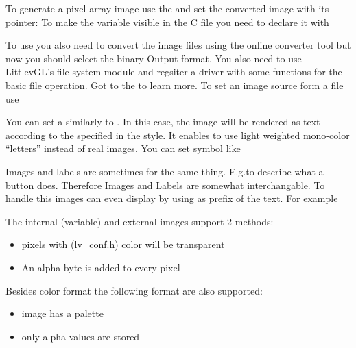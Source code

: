 \documentclass[letterpaper,10pt,english]{sphinxmanual}
\begin{document}
To generate a pixel array  image use the  and set the converted image with its pointer: 
To make the variable visible in the C file you need to declare it with 

To use  you also need to convert the image files using the online converter tool but now you should select the binary Output format.
You also need to use LittlevGL’s file system module and regsiter a driver with some functions for the basic file operation. Got to the {\hyperref[\detokenize{overview/file-system::doc}]{}} to learn more.
To set an image source form a file use 

You can set a   similarly to {\hyperref[\detokenize{object-types/label::doc}]{}}. In this case, the image will be rendered as text according to the  specified in the style.  It enables to use light weighted mono-color
“letters” instead of real images. You can set symbol like 

Images and labels are sometimes for the same thing. E.g.to describe what a button does. Therefore Images and Labels are somewhat interchangable.
To handle this images can even display  by using  as prefix of the text. For example 

The internal (variable) and external images support 2  methods:
\begin{itemize}
\item {} 
 pixels with  (lv\_conf.h) color will be transparent

\item {} 
 An alpha byte is added to every pixel

\end{itemize}

Besides  color format the following format are also supported:
\begin{itemize}
\item {} 
 image has a palette

\item {} 
 only alpha values are stored

\end{itemize}
\end{document}
